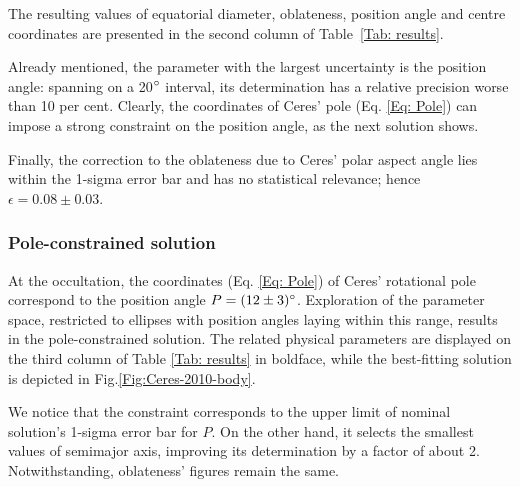 \documentclass[useAMS,usenatbib]{mn2e}
\begin{document}
The resulting values of equatorial diameter, oblateness, position angle and centre coordinates are presented in the second column of Table~\ref{Tab: results}.%

Already mentioned, the parameter with the largest uncertainty is the position angle: spanning on a 20$\hbox{$^\circ$}$ interval, its determination has a relative precision worse than 10 per cent. Clearly, the coordinates of Ceres' pole (Eq. \ref{Eq: Pole}) can impose a strong constraint on the position angle, as the next solution shows.

Finally, the correction to the oblateness due to Ceres' polar aspect angle lies within the 1-sigma error bar and has no statistical relevance; hence $\epsilon = 0.08 \pm 0.03$.





\subsubsection{Pole-constrained solution}

At the occultation, the coordinates (Eq. \ref{Eq: Pole}) of Ceres' rotational pole correspond to the position angle $P = (12 \pm 3)\hbox{$^\circ$}$. Exploration of the parameter space, restricted to ellipses with position angles laying within this range, results in the pole-constrained solution. The related physical parameters are displayed on the third column of Table \ref{Tab: results} in boldface, while the best-fitting solution is depicted in Fig.\ref{Fig:Ceres-2010-body}.

We notice that the constraint corresponds to the upper limit of nominal solution's 1-sigma error bar for $P$. On the other hand, it selects the smallest values of semimajor axis, improving its determination by a factor of about 2. Notwithstanding, oblateness' figures remain the same.
\end{document}
